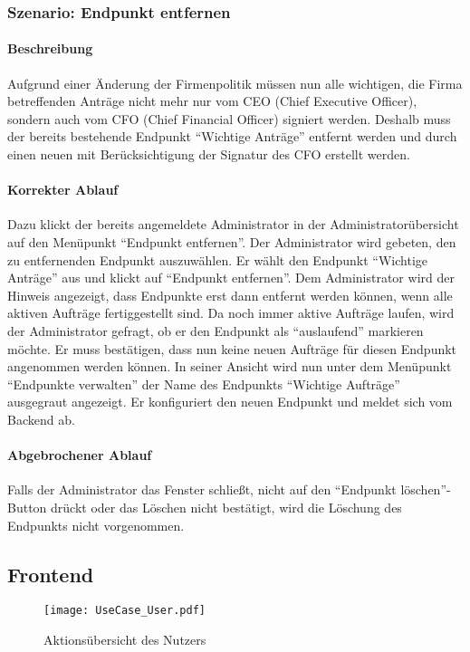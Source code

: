 \subsubsection{Szenario: Endpunkt entfernen}
\paragraph{Beschreibung}
Aufgrund einer Änderung der Firmenpolitik müssen nun alle wichtigen, die Firma betreffenden Anträge nicht mehr nur vom CEO (Chief Executive Officer), sondern auch vom CFO (Chief Financial Officer) signiert werden. Deshalb muss der bereits bestehende Endpunkt \enquote{Wichtige Anträge} entfernt werden und durch einen neuen  mit Berücksichtigung der Signatur des CFO erstellt werden.
\paragraph{Korrekter Ablauf}
Dazu klickt der bereits angemeldete Administrator in der Administratorübersicht auf den Menüpunkt \enquote{Endpunkt entfernen}. Der Administrator wird gebeten, den zu entfernenden Endpunkt auszuwählen. Er wählt den Endpunkt \enquote{Wichtige Anträge} aus und klickt auf \enquote{Endpunkt entfernen}. Dem Administrator wird der Hinweis angezeigt, dass Endpunkte erst dann entfernt werden können, wenn alle aktiven Aufträge fertiggestellt sind. Da noch immer aktive Aufträge laufen, wird der Administrator gefragt, ob er den Endpunkt als \enquote{auslaufend} markieren möchte. Er muss bestätigen, dass nun keine neuen Aufträge für diesen Endpunkt angenommen werden können. In seiner Ansicht wird nun unter dem Menüpunkt \enquote{Endpunkte verwalten} der Name des Endpunkts \enquote{Wichtige Aufträge} ausgegraut angezeigt.
Er konfiguriert den neuen Endpunkt und meldet sich vom Backend ab.
\paragraph{Abgebrochener Ablauf}
Falls der Administrator das Fenster schließt, nicht auf den \enquote{Endpunkt löschen}-Button drückt oder das Löschen nicht bestätigt, wird die Löschung des Endpunkts nicht vorgenommen.


\subsection{Frontend}
\begin{figure}[htbp]
	\centering
	\texttt{[image: UseCase\_User.pdf]}
	\caption{Aktionsübersicht des Nutzers}
	\label{fig:Bild2}
\end{figure}

